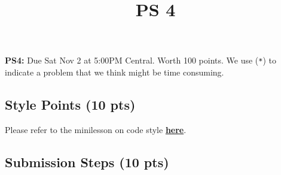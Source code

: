 \documentclass[
  letterpaper,
  DIV=11,
  numbers=noendperiod]{scrartcl}
\title{PS 4}
\author{}
\date{}
\begin{document}
\maketitle



\textbf{PS4:} Due Sat Nov 2 at 5:00PM Central. Worth 100 points. We use
(\texttt{*}) to indicate a problem that we think might be time
consuming.

\subsection{Style Points (10 pts)}\label{style-points-10-pts}

Please refer to the minilesson on code style
\textbf{\href{https://uchicago.zoom.us/rec/share/pG_wQ-pHTQrJTmqNn4rcrw5V194M2H2s-2jdy8oVhWHkd_yZt9o162IWurpA-fxU.BIQlSgZLRYctvzp-}{here}}.

\subsection{Submission Steps (10 pts)}\label{submission-steps-10-pts}
\end{document}
